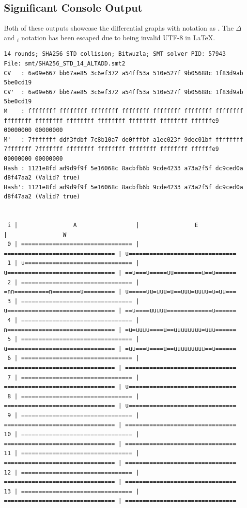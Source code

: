 \documentclass[a4paper]{report}
\begin{document}
\pagebreak
\begin{landscape}
\subsection{Significant Console Output}
Both of these outputs showcase the differential graphs with notation as \cite{li_2024}.
The $\Delta$ and $_i$ notation has been escaped due to being invalid UTF-8 in LaTeX.

\begin{lstlisting}[caption={14 round collision output obtained by running
\texttt{sha2-collision benchmark --solver bitwuzla --hash-function sha256 --collision-type std --round-range 14..15 -R true -E bruteforce::true}}, label=lst:collision-output-simpl]
14 rounds; SHA256 STD collision; Bitwuzla; SMT solver PID: 57943
File: smt/SHA256_STD_14_ALTADD.smt2
CV   : 6a09e667 bb67ae85 3c6ef372 a54ff53a 510e527f 9b05688c 1f83d9ab 5be0cd19
CV'  : 6a09e667 bb67ae85 3c6ef372 a54ff53a 510e527f 9b05688c 1f83d9ab 5be0cd19
M    : ffffffff ffffffff ffffffff ffffffff ffffffff ffffffff ffffffff ffffffff ffffffff ffffffff ffffffff ffffffff ffffffff ffffffe9 00000000 00000000
M'   : 7fffffff ddf3fdbf 7c8b10a7 de0fffbf a1ec023f 9dec01bf ffffffff 7fffffff 7fffffff ffffffff ffffffff ffffffff ffffffff ffffffe9 00000000 00000000
Hash : 1121e8fd ad9d9f9f 5e16068c 8acbfb6b 9cde4233 a73a2f5f dc9ced0a d8f47aa2 (Valid? true)
Hash': 1121e8fd ad9d9f9f 5e16068c 8acbfb6b 9cde4233 a73a2f5f dc9ced0a d8f47aa2 (Valid? true)


 i |                A                 |                E                 |                W
 0 | ================================ | ================================ | u===============================
 1 | u=============================== | u=============================== | ==u===u=====uu========u==u======
 2 | ================================ | =nn==========n========u========= | u=====uu=uuu=u==uuu=uuuu=u=uu===
 3 | ================================ | u=============================== | ==u====uuuuu=============u======
 4 | ================================ | n=============================== | =u=uuuu====u==uuuuuuuu=uuu======
 5 | ================================ | u=============================== | =uu===u====u==uuuuuuuuu==u======
 6 | ================================ | ================================ | ================================
 7 | ================================ | ================================ | u===============================
 8 | ================================ | ================================ | u===============================
 9 | ================================ | ================================ | ================================
10 | ================================ | ================================ | ================================
11 | ================================ | ================================ | ================================
12 | ================================ | ================================ | ================================
13 | ================================ | ================================ | ================================
\end{lstlisting}


\end{landscape}
\end{document}

